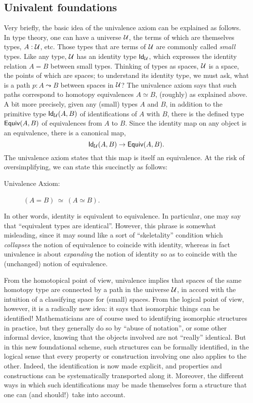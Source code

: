 \subsection*{Univalent foundations}

Very briefly, the basic idea of the univalence axiom can be explained as follows.
In type theory, one can have a universe $\UU$, the terms of which are themselves types, $A : \UU$, etc.
Those types that are terms of $\UU$ are commonly called \emph{small} types.
Like any type, $\UU$ has an identity type $\idtypevar{\UU}$, which expresses the identity relation $A = B$ between small types.
Thinking of types as spaces, $\UU$ is a space, the points of which are spaces; to understand its identity type, we must ask, what is a path $p : A \leadsto B$ between spaces in $\UU$?
The univalence axiom says that such paths correspond to homotopy equivalences $A\simeq B$, (roughly) as explained above.
A bit more precisely, given any (small) types $A$ and $B$, in addition to the primitive type $\idtype[\UU]AB$ of identifications of $A$ with $B$, there is the defined type $\texteqv AB$ of equivalences from $A$ to $B$.
Since the identity map on any object is an equivalence, there is a canonical map,
\[\idtype[\UU]AB\to\texteqv AB.\]
The univalence axiom states that this map is itself an equivalence.
At the risk of oversimplifying, we can state this succinctly as follows:

\begin{description}
\item[Univalence Axiom:]  $(A = B)\ \simeq\ (A\simeq B)$.
\end{description}
%
In other words, identity is equivalent to equivalence. 
In particular, one may say that ``equivalent types are identical''.
However, this phrase is somewhat misleading, since it may sound like a sort of ``skeletality'' condition which \emph{collapses} the notion of equivalence to coincide with identity, whereas in fact univalence is about \emph{expanding} the notion of identity so as to coincide with the (unchanged) notion of equivalence.

From the homotopical point of view, univalence implies that spaces of the same homotopy type are connected by a path in the universe $\UU$, in accord with the intuition of a classifying space for (small) spaces.
From the logical point of view, however, it is a radically new idea: it says that isomorphic things can be identified!  Mathematicians are of course used to identifying isomorphic structures in practice, but they generally do so by ``abuse of notation'', or some other informal device, knowing that the objects involved are not ``really'' identical.  But in this new foundational scheme, such structures can be formally identified, in the logical sense that every property or construction involving one also applies to the other. Indeed, the identification is now made explicit, and properties and constructions can be systematically transported along it.  Moreover, the different ways in which such identifications may be made themselves form a structure that one can (and should!)\ take into account.

